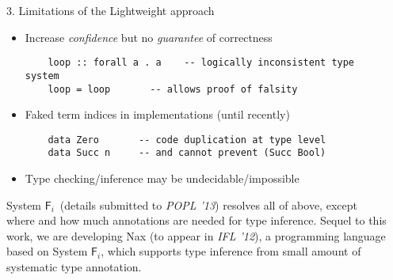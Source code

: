 \documentclass[final]{beamer}
\newcommand{\Fi}{\ensuremath{\mathsf{F}_{\!i}}}
\begin{document}
\begin{frame}[fragile]
\begin{columns}[t]
\begin{column}{.315\linewidth}
\begin{block}{3. Limitations of the Lightweight approach}
\begin{itemize}
\item Increase \emph{confidence} but no \emph{guarantee} of correctness
	\begin{lstlisting}
	loop :: forall a . a    -- logically inconsistent type system
	loop = loop       -- allows proof of falsity
	\end{lstlisting}
\item Faked term indices in implementations (until recently)
	\begin{lstlisting}
	data Zero       -- code duplication at type level
	data Succ n     -- and cannot prevent (Succ Bool)
	\end{lstlisting}
\item Type checking/inference may be undecidable/impossible
\end{itemize}
\begin{spacing}{1}\small
System \Fi\ (details submitted to \textit{POPL '13}) resolves all of above,
except where and how much annotations are needed for type inference.
Sequel to this work, we are developing Nax (to appear in \textit{IFL '12}),
a programming language based on System \Fi, which supports type inference
from small amount of systematic type annotation.
\end{spacing}
\end{block}


\end{column}
\begin{column}{.315\linewidth}


\end{column}
\end{columns}
\end{frame}
\end{document}
